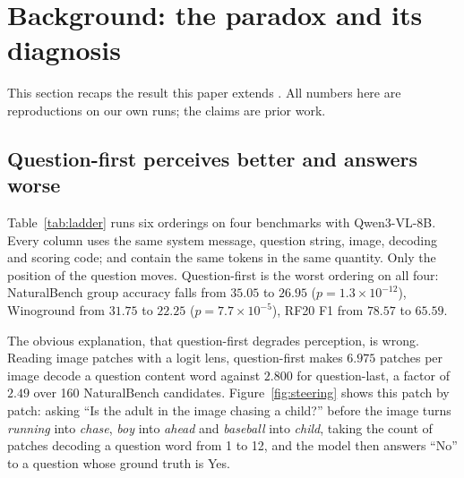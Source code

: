 \section{Background: the paradox and its diagnosis}
\label{sec:background}

This section recaps the result this paper extends \citep{anon-workshop}. All
numbers here are reproductions on our own runs; the claims are prior work.

\subsection{Question-first perceives better and answers worse}

Table~\ref{tab:ladder} runs six orderings on four benchmarks with Qwen3-VL-8B.
Every column uses the same system message, question string, image, decoding and
scoring code; \sti{} and \sit{} contain the same tokens in the same quantity.
Only the position of the question moves. Question-first is the worst ordering on
all four: NaturalBench group accuracy falls from $35.05$ to $26.95$
($p = 1.3\times10^{-12}$), Winoground from $31.75$ to $22.25$
($p = 7.7\times10^{-5}$), RF20 F1 from $78.57$ to $65.59$.

The obvious explanation, that question-first degrades perception, is wrong.
Reading image patches with a logit lens, question-first makes $6.975$ patches
per image decode a question content word against $2.800$ for question-last, a
factor of $2.49$ over 160 NaturalBench candidates. Figure~\ref{fig:steering}
shows this patch by patch: asking ``Is the adult in the image chasing a child?''
before the image turns \emph{running} into \emph{chase}, \emph{boy} into
\emph{ahead} and \emph{baseball} into \emph{child}, taking the count of patches
decoding a question word from 1 to 12, and the model then answers ``No'' to a
question whose ground truth is Yes.

